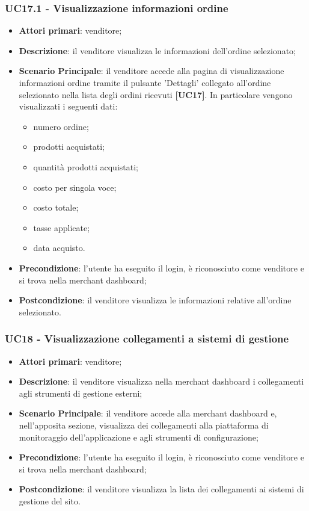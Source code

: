 \subsubsection{UC17.1 - Visualizzazione informazioni ordine}
\begin{itemize}
\item \textbf{Attori primari}: venditore;
\item \textbf{Descrizione}: il venditore visualizza le informazioni dell'ordine selezionato;
\item \textbf{Scenario Principale}: il venditore accede alla pagina di visualizzazione informazioni ordine tramite il pulsante 'Dettagli' collegato all'ordine selezionato nella lista degli ordini ricevuti \textbf{[UC17]}. In particolare vengono visualizzati i seguenti dati:
\begin{itemize}
	\item numero ordine;
	\item prodotti acquistati;
	\item quantità prodotti acquistati;
	\item costo per singola voce;
	\item costo totale;
	\item tasse applicate;
	\item data acquisto.
\end{itemize}
\item \textbf{Precondizione}: l'utente ha eseguito il login, è riconosciuto come venditore e si trova nella merchant dashboard;
\item \textbf{Postcondizione}: il venditore visualizza le informazioni relative all'ordine selezionato.
\end{itemize}

\subsubsection{UC18 - Visualizzazione collegamenti a sistemi di gestione}
\begin{itemize}
\item \textbf{Attori primari}: venditore;
\item \textbf{Descrizione}: il venditore visualizza nella merchant dashboard i collegamenti agli strumenti di gestione esterni;
\item \textbf{Scenario Principale}: il venditore accede alla merchant dashboard e, nell'apposita sezione, visualizza dei collegamenti alla piattaforma di monitoraggio dell'applicazione e agli strumenti di configurazione;
\item \textbf{Precondizione}: l'utente ha eseguito il login, è riconosciuto come venditore e si trova nella merchant dashboard;
\item \textbf{Postcondizione}: il venditore visualizza la lista dei collegamenti ai sistemi di gestione del sito.
\end{itemize}

